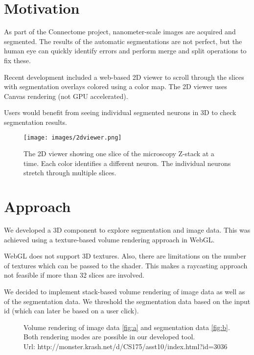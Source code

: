\documentclass[annual]{acmsiggraph}
\begin{document}

\copyrightspace


\section{Motivation}

As part of the Connectome project, nanometer-scale images are acquired and segmented. The results of the automatic segmentations are not perfect, but the human eye can quickly identify errors and perform merge and split operations to fix these. 

Recent development included a web-based 2D viewer to scroll through the slices with segmentation overlays colored using a color map. The 2D viewer uses Canvas rendering (not GPU accelerated).

Users would benefit from seeing individual segmented neurons in 3D to check segmentation results. 

\begin{figure}[h]
\caption{The 2D viewer showing one slice of the microscopy Z-stack at a time. Each color identifies a different neuron. The individual neurons stretch through multiple slices.}
\texttt{[image: images/2dviewer.png]} 
\end{figure}

\section{Approach}
We developed a 3D component to explore segmentation and image data. This was achieved using a texture-based volume rendering approach in WebGL.

WebGL does not support 3D textures. Also, there are limitations on the number of textures which can be passed to the shader. This makes a raycasting approach not feasible if more than 32 slices are involved.

We decided to implement stack-based volume rendering of image data as well as of the segmentation data. We threshold the segmentation data based on the input id (which can later be based on a user click).

\begin{figure}
\centering     %
{}
\caption{Volume rendering of image data \ref{fig:a} and segmentation data \ref{fig:b}. Both rendering modes are possible in our developed tool. \\Url: http://monster.krash.net/d/CS175/asst10/index.html?id=3036}
\label{fig:compare0}
\end{figure}
\end{document}

